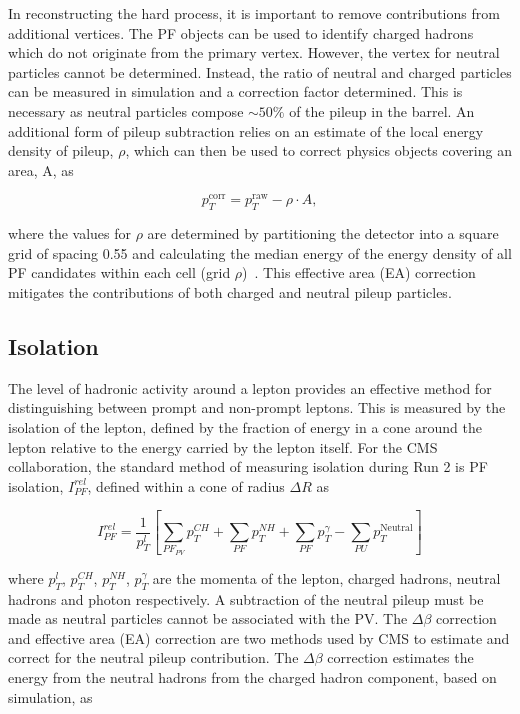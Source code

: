 In reconstructing the hard process, it is important to remove contributions from additional
vertices. The PF objects can be used to identify 
charged hadrons which do not originate from the primary vertex. However, the vertex 
for neutral particles cannot be determined. Instead, the ratio of neutral and 
charged particles can be measured in simulation and a correction factor determined.
This is necessary as neutral particles compose $\sim 50\%$ of the pileup in the barrel.
An additional form of pileup subtraction relies on an estimate of the local energy density 
of pileup, $\rho$, which can then be used to correct physics objects covering an area,
A, as

\begin{equation}
p_T^{\text{corr}} = p_T^{\text{raw}} - \rho \cdot A,
\end{equation}

where the values for $\rho$ are determined by partitioning the detector into a square grid of spacing
0.55 and calculating the median energy of the energy density of all PF candidates within each cell (grid $\rho$)~\cite{fastjet,jet_area}.
This effective area (EA) correction mitigates the contributions of both charged and neutral 
pileup particles.

\subsection{Isolation}

The level of hadronic activity around a lepton provides an effective method for 
distinguishing between prompt and non-prompt leptons.
This is measured by the isolation of the lepton, defined by the fraction of energy
in a cone around the lepton relative to the energy carried by the lepton itself. For the
CMS collaboration, the standard method of measuring isolation during Run 2 
is PF isolation, $I_{PF}^{rel}$, defined within a cone of radius $\Delta R$ as 

\begin{equation}
I_{PF}^{rel} = \frac{1}{p_T^{l}}\left[ \sum_{PF_{PV}}p_T^{CH} +  \sum_{PF}p_T^{NH} +  \sum_{PF}p_T^{\gamma} -  \sum_{PU}p_T^{\text{Neutral}}\right]
\end{equation}

where $p_T^{l}$, $p_T^{CH}$, $p_T^{NH}$, $p_T^{\gamma}$ are the momenta of the lepton, charged hadrons, neutral hadrons and photon respectively.
A subtraction of the neutral pileup must be made as neutral particles cannot be associated with the PV. The $\Delta \beta$ correction
and effective area (EA) correction are two methods used by CMS to estimate and correct for the neutral pileup contribution. The $\Delta \beta$
correction estimates the energy from the neutral hadrons from the charged hadron component, based on simulation, as

